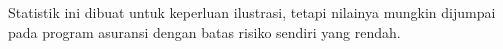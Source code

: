 \item[\ref{geomDist}]
    Statistik ini dibuat untuk keperluan ilustrasi, tetapi nilainya mungkin
    dijumpai pada program asuransi dengan batas risiko sendiri yang rendah.


